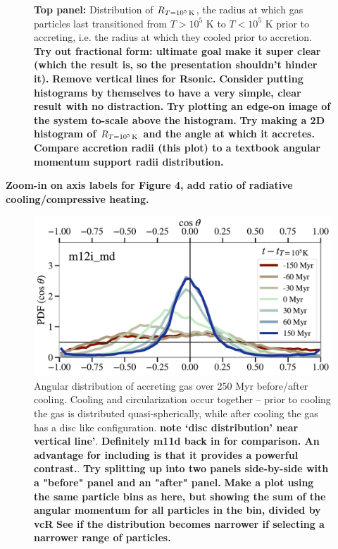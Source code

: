 \documentclass[fleqn,usenatbib]{mnras}
\newcommand{\Rcon}{R_{T=10^5\,{\rm K}}}
\begin{document}
\begin{figure}
{    \textbf{Top panel:} Distribution of $\Rcon$, the radius at which gas particles last transitioned from $T > 10^5$ K to $T < 10^5$ K prior to accreting, i.e. the radius at which they cooled prior to accretion.
    \textbf{Try out fractional form: ultimate goal make it super clear (which the result is, so the presentation shouldn't hinder it).}
    \textbf{Remove vertical lines for Rsonic.}
    \textbf{Consider putting histograms by themselves to have a very simple, clear result with no distraction.}
    \textbf{
    Try plotting an edge-on image of the system to-scale above the histogram.
    }
    \textbf{
    Try making a 2D histogram of $\Rcon$ and the angle at which it accretes.
    }
 \textbf{Compare accretion radii (this plot) to a textbook angular momentum support radii distribution.}
    }
    \label{f: T vs R}
\end{figure}



\textbf{Zoom-in on axis labels for Figure 4, add ratio of radiative cooling/compressive heating.}

\begin{figure}
    \centering
    \includegraphics[width=\columnwidth]{figures/theta_vs_t.pdf}
    \caption{
    Angular distribution of accreting gas over 250 Myr before/after cooling. Cooling and circularization occur together -- prior to cooling the gas is distributed quasi-spherically, while after cooling the gas has a disc like configuration.
    \textbf{note `disc distribution' near vertical line'}.
    \textbf{Definitely m11d back in for comparison. An advantage for including is that it provides a powerful contrast.}.
    \textbf{Try splitting up into two panels side-by-side with a "before" panel and an "after" panel.}
    \textbf{Make a plot using the same particle bins as here, but showing the sum of the angular momentum for all particles in the bin, divided by vcR}
    \textbf{See if the distribution becomes narrower if selecting a narrower range of particles.}
    }
    \label{f: theta vs R}
\end{figure}
\end{document}
